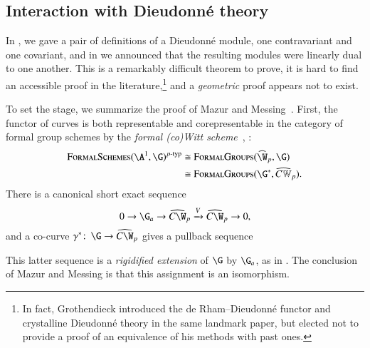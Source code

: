 \subsection*{Interaction with Dieudonn\'e theory}

In , we gave a pair of definitions of a Dieudonn\'e module, one contravariant and one covariant, and in  we announced that the resulting modules were linearly dual to one another.  This is a remarkably difficult theorem to prove, it is hard to find an accessible proof in the literature,\footnote{In fact, Grothendieck introduced the de Rham--Dieudonn\'e functor and crystalline Dieudonn\'e theory in the same landmark paper, but elected not to provide a proof of an equivalence of his methods with past ones.} and a \emph{geometric} proof appears not to exist.

To set the stage, we summarize the proof of Mazur and Messing~\cite[Section II.15]{MazurMessing}.  First, the functor of curves is both representable and corepresentable in the category of formal group schemes by the \textit{formal (co)Witt scheme}~\cite[Chapter 3]{ZinkCartierTheory}, \cite[Section III.4]{LazardCFGs}:
\begin{align*}
\CatOf{FormalSchemes}(\A^1, \G)^{\ptyp} & \cong \CatOf{FormalGroups}(\widehat{\W}_p, \G) \\
& \cong \CatOf{FormalGroups}(\G^*, \widehat{C\mathbb W}_p).
\end{align*}
There is a canonical short exact sequence \[0 \to \G_a \to \widehat{C\W}_p \xrightarrow{V} \widehat{C\W}_p \to 0,\] and a co-curve $\gamma^*\co \G \to \widehat{C\W}_p$ gives a pullback sequence
\begin{center}
\end{center}
This latter sequence is a \textit{rigidified extension} of $\G$ by $\G_a$, as in .  The conclusion of Mazur and Messing is that this assignment is an isomorphism.


